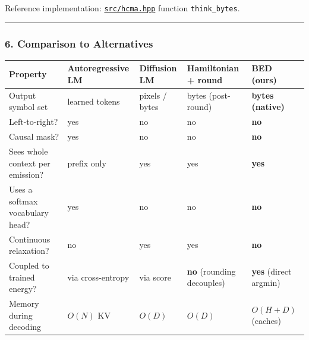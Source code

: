 \documentclass[
  11pt,
  a4paper,
]{article}
\begin{document}
Reference implementation: \href{../src/hcma.hpp}{\texttt{src/hcma.hpp}}
function \texttt{think\_bytes}.

\begin{center}\rule{0.5\linewidth}{0.5pt}\end{center}

\subsubsection{6. Comparison to
Alternatives}\label{comparison-to-alternatives}

\begin{longtable}[]{@{}
  >{\raggedright\arraybackslash}p{}
  >{\raggedright\arraybackslash}p{}
  >{\raggedright\arraybackslash}p{}
  >{\raggedright\arraybackslash}p{}
  >{\raggedright\arraybackslash}p{}@{}}
\toprule\noalign{}
\begin{minipage}[b]{\linewidth}\raggedright
Property
\end{minipage} & \begin{minipage}[b]{\linewidth}\raggedright
Autoregressive LM
\end{minipage} & \begin{minipage}[b]{\linewidth}\raggedright
Diffusion LM
\end{minipage} & \begin{minipage}[b]{\linewidth}\raggedright
Hamiltonian + round
\end{minipage} & \begin{minipage}[b]{\linewidth}\raggedright
\textbf{BED (ours)}
\end{minipage} \\
\midrule\noalign{}
\endhead
\bottomrule\noalign{}
\endlastfoot
Output symbol set & learned tokens & pixels / bytes & bytes (post-round)
& \textbf{bytes (native)} \\
Left-to-right? & yes & no & no & \textbf{no} \\
Causal mask? & yes & no & no & \textbf{no} \\
Sees whole context per emission? & prefix only & yes & yes &
\textbf{yes} \\
Uses a softmax vocabulary head? & yes & no & no & \textbf{no} \\
Continuous relaxation? & no & yes & yes & \textbf{no} \\
Coupled to trained energy? & via cross-entropy & via score & \textbf{no}
(rounding decouples) & \textbf{yes} (direct argmin) \\
Memory during decoding & \(O(N)\) KV & \(O(D)\) & \(O(D)\) &
\(O(H + D)\) (caches) \\
\end{longtable}
\end{document}
